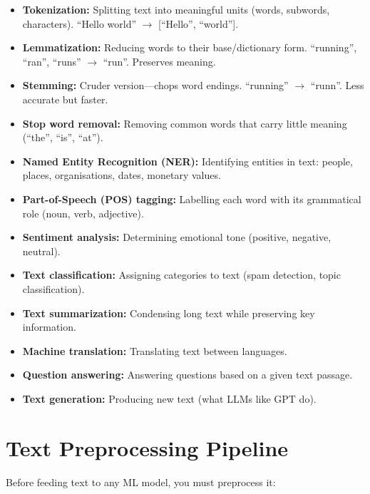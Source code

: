 \documentclass[12pt, a4paper, oneside]{book}
\begin{document}
\begin{itemize}[leftmargin=2em]
    \item \textbf{Tokenization:} Splitting text into meaningful units (words, subwords, characters). ``Hello world'' $\to$ [``Hello'', ``world''].
    \item \textbf{Lemmatization:} Reducing words to their base/dictionary form. ``running'', ``ran'', ``runs'' $\to$ ``run''. Preserves meaning.
    \item \textbf{Stemming:} Cruder version---chops word endings. ``running'' $\to$ ``runn''. Less accurate but faster.
    \item \textbf{Stop word removal:} Removing common words that carry little meaning (``the'', ``is'', ``at'').
    \item \textbf{Named Entity Recognition (NER):} Identifying entities in text: people, places, organisations, dates, monetary values.
    \item \textbf{Part-of-Speech (POS) tagging:} Labelling each word with its grammatical role (noun, verb, adjective).
    \item \textbf{Sentiment analysis:} Determining emotional tone (positive, negative, neutral).
    \item \textbf{Text classification:} Assigning categories to text (spam detection, topic classification).
    \item \textbf{Text summarization:} Condensing long text while preserving key information.
    \item \textbf{Machine translation:} Translating text between languages.
    \item \textbf{Question answering:} Answering questions based on a given text passage.
    \item \textbf{Text generation:} Producing new text (what LLMs like GPT do).
\end{itemize}

\section{Text Preprocessing Pipeline}

Before feeding text to any ML model, you must preprocess it:
\end{document}
